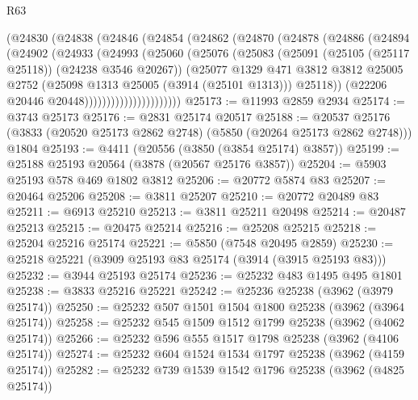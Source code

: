 \begin{lexlean}{R63}
\begin{coremodule}
                  (@24830
                    (@24838
                      (@24846
                        (@24854
                          (@24862
                            (@24870
                              (@24878
                                (@24886
                                  (@24894
                                    (@24902
                                      (@24933
                                        (@24993
                                          (@25060
                                            (@25076
                                              (@25083
                                                (@25091
                                                  (@25105 (@25117 @25118))
                                                  (@24238 @3546 @20267))
                                                (@25077
                                                  @1329
                                                  @471
                                                  @3812
                                                  @3812
                                                  @25005
                                                  @2752
                                                  (@25098 @1313 @25005 (@3914 (@25101 @1313)))
                                                  @25118))
                                              (@22206 @20446 @20448))))))))))))))))))))))
@25173 := @11993 @2859 @2934
@25174 := @3743 @25173
@25176 := @2831 @25174 @20517
@25188 := @20537
    @25176
    (@3833 (@20520 @25173 @2862 @2748) (@5850 (@20264 @25173 @2862 @2748)))
    @1804
@25193 := @4411 (@20556 (@3850 (@3854 @25174) @3857))
@25199 := @25188 @25193 @20564 (@3878 (@20567 @25176 @3857))
@25204 := @5903 @25193 @578 @469 @1802 @3812
@25206 := @20772 @5874 @83
@25207 := @20464 @25206
@25208 := @3811 @25207
@25210 := @20772 @20489 @83
@25211 := @6913 @25210
@25213 := @3811 @25211 @20498
@25214 := @20487 @25213
@25215 := @20475 @25214
@25216 := @25208 @25215
@25218 := @25204 @25216 @25174
@25221 := @5850 (@7548 @20495 @2859)
@25230 := @25218 @25221 (@3909 @25193 @83 @25174 (@3914 (@3915 @25193 @83)))
@25232 := @3944 @25193 @25174
@25236 := @25232 @483 @1495 @495 @1801
@25238 := @3833 @25216 @25221
@25242 := @25236 @25238 (@3962 (@3979 @25174))
@25250 := @25232 @507 @1501 @1504 @1800 @25238 (@3962 (@3964 @25174))
@25258 := @25232 @545 @1509 @1512 @1799 @25238 (@3962 (@4062 @25174))
@25266 := @25232 @596 @555 @1517 @1798 @25238 (@3962 (@4106 @25174))
@25274 := @25232 @604 @1524 @1534 @1797 @25238 (@3962 (@4159 @25174))
@25282 := @25232 @739 @1539 @1542 @1796 @25238 (@3962 (@4825 @25174))

\end{coremodule}
\end{lexlean}
